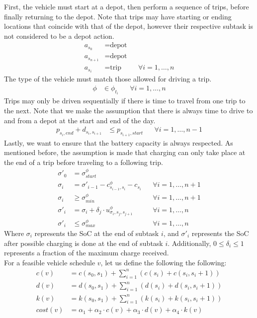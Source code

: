 \documentclass[]{article}
\begin{document}
First, the vehicle must start at a depot, then perform a sequence of trips, before finally returning to the depot. Note that trips may have starting or ending locations that coincide with that of the depot, however their respective subtask is not considered to be a depot action.
\begin{align}
  a_{s_0} &= \text{depot} && \\
  a_{s_{n+1}} &= \text{depot} && \\ 
  a_{s_i} &= \text{trip} && \forall i = 1, \dots, n
\end{align}
The type of the vehicle must match those allowed for driving a trip. 
\begin{align}
  \phi &\in \phi_{t_i} && \forall i = 1, \dots, n
\end{align}
Trips may only be driven sequentially if there is time to travel from one trip to the next. Note that we make the assumption that there is always time to drive to and from a depot at the start and end of the day. 
\begin{align}
  p_{s_i,end} + d_{s_i, s_{i+1}} &\leq p_{s_{i+1},start} && \forall i = 1, \dots, n-1
\end{align}
Lastly, we want to ensure that the battery capacity is always respected. As mentioned before, the assumption is made that charging can only take place at the end of a trip before traveling to a following trip.
\begin{align}
  \sigma'_0 &= \sigma^\phi_{start} \\
  \sigma_{i} &= \sigma'_{i-1} - c^\phi_{s_{i-1}, s_{i}} - c_{s_{i}} && \forall i = 1, \dots, n + 1 \\
  \sigma_{i} &\geq \sigma^\phi_{min} && \forall i = 1, \dots, n + 1 \\
  \sigma'_{i} &= \sigma_{i} + \delta_j \cdot u^\phi_{\sigma_{i},s_{j}, s_{j+1}} && \forall i = 1, \dots, n \\
  \sigma'_{i} &\leq \sigma^\phi_{max} && \forall i = 1, \dots, n
\end{align}
Where $\sigma_i$ represents the SoC at the end of subtask $i$, and $\sigma'_i$ represents the SoC after possible charging is done at the end of subtask $i$. Additionally, $0 \leq \delta_i \leq 1$ represents a fraction of the maximum charge received. \\
For a feasible vehicle schedule $v$, let us define the following the following:
\begin{align}
  c(v) &= c(s_0, s_1) + \sum^{n}_{i = 1}(c(s_i) + c(s_i, s_i + 1))  \\
  d(v) &= d(s_0, s_1) + \sum^{n}_{i = 1}(d(s_i) + d(s_i, s_i + 1))  \\
  k(v) &= k(s_0, s_1) + \sum^{n}_{i = 1}(k(s_i) + k(s_i, s_i + 1))  \\
  cost(v) &= \alpha_1 + \alpha_2 \cdot c(v) + \alpha_3 \cdot d(v) + \alpha_4 \cdot k(v) 
\end{align}
\end{document}
